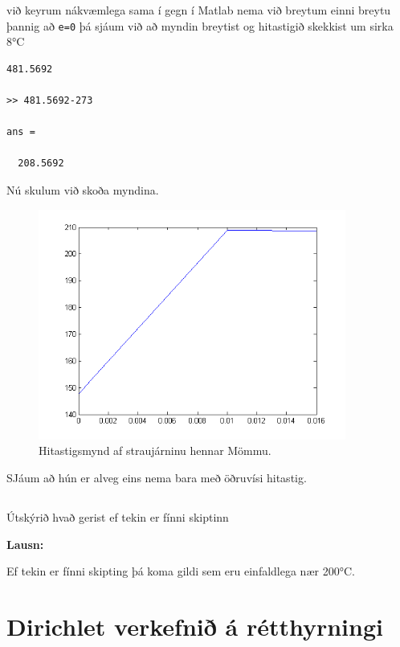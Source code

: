 \documentclass[11pt,a4paper,titlepage]{article}
\begin{document}
við keyrum  nákvæmlega sama í gegn í Matlab nema við breytum einni breytu þannig að \verb|e=0| þá sjáum við að myndin breytist og hitastigið skekkist um sirka 8°C

\begin{verbatim}
481.5692

>> 481.5692-273

ans =

  208.5692
\end{verbatim}

Nú skulum við skoða myndina. 
 \begin{figure}[h!]
      \centering
      \includegraphics[width=0.9\textwidth]{2_2_e_0.png}
      \caption{Hitastigsmynd af straujárninu hennar Mömmu.}
      \label{fig:awesome_image4}
  \end{figure}
  SJáum að hún er alveg eins nema bara með öðruvísi hitastig. 


\subsection{}
Útskýrið hvað gerist ef tekin er fínni skiptinn

\par
\textbf{Lausn:}\par

Ef tekin er fínni skipting þá koma gildi sem eru einfaldlega nær 200°C.  


\section{Dirichlet verkefnið á rétthyrningi}

\subsection{}
\end{document}
